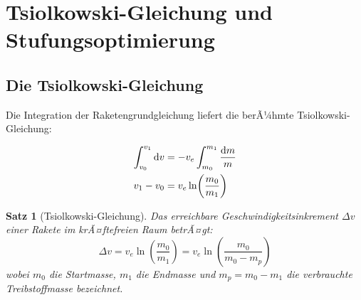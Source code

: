 ﻿\documentclass[12pt,a4paper]{article}
\newtheorem{satz}{Satz}[section]
\newcommand{\ve}{v_e}
\newcommand{\Dv}{\Delta v}
\begin{document}
\section{Tsiolkowski-Gleichung und Stufungsoptimierung}

\subsection{Die Tsiolkowski-Gleichung}

Die Integration der Raketengrundgleichung liefert die berÃ¼hmte
Tsiolkowski-Gleichung:

\begin{align}
  \int_{v_0}^{v_1} \dd v &= -\ve \int_{m_0}^{m_1} \frac{\dd m}{m} \notag\\
  v_1 - v_0 &= \ve \ln\!\left(\frac{m_0}{m_1}\right)
\end{align}

\begin{satz}[Tsiolkowski-Gleichung]
Das erreichbare Geschwindigkeitsinkrement $\Dv$ einer Rakete im krÃ¤ftefreien Raum
betrÃ¤gt:
\[
  \boxed{\Dv = \ve \ln\!\left(\frac{m_0}{m_1}\right) = \ve \ln\!\left(\frac{m_0}{m_0 - m_p}\right)}
\]
wobei $m_0$ die Startmasse, $m_1$ die Endmasse und $m_p = m_0 - m_1$ die
verbrauchte Treibstoffmasse bezeichnet.
\end{satz}
\end{document}
